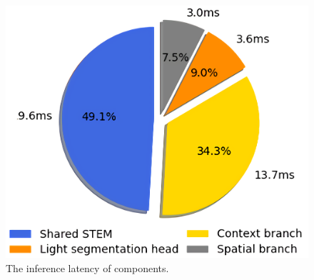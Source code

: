 \begin{figure}
  \centering
   \includegraphics[scale=0.6]{latency_proportion.png}
  \caption{The inference latency of components.}
  \label{lat}
\end{figure}